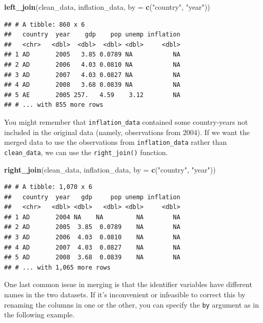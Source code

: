 \documentclass[12pt,oneside,openany]{book}
\newenvironment{Shaded}{\begin{snugshade}}{\end{snugshade}}
\newcommand{\KeywordTok}[1]{\textcolor[rgb]{0.13,0.29,0.53}{\textbf{#1}}}
\newcommand{\DataTypeTok}[1]{\textcolor[rgb]{0.13,0.29,0.53}{#1}}
\newcommand{\StringTok}[1]{\textcolor[rgb]{0.31,0.60,0.02}{#1}}
\newcommand{\NormalTok}[1]{#1}
\begin{document}
\begin{Shaded}
\begin{Highlighting}[]
\KeywordTok{left_join}\NormalTok{(clean_data,}
\NormalTok{          inflation_data,}
          \DataTypeTok{by =} \KeywordTok{c}\NormalTok{(}\StringTok{"country"}\NormalTok{, }\StringTok{"year"}\NormalTok{))}
\end{Highlighting}
\end{Shaded}

\begin{verbatim}
## # A tibble: 860 x 6
##   country  year    gdp    pop unemp inflation
##   <chr>   <dbl>  <dbl>  <dbl> <dbl>     <dbl>
## 1 AD       2005   3.85 0.0789 NA           NA
## 2 AD       2006   4.03 0.0810 NA           NA
## 3 AD       2007   4.03 0.0827 NA           NA
## 4 AD       2008   3.68 0.0839 NA           NA
## 5 AE       2005 257.   4.59    3.12        NA
## # ... with 855 more rows
\end{verbatim}

You might remember that \texttt{inflation\_data} contained some
country-years not included in the original data (namely, observations
from 2004). If we want the merged data to use the observations from
\texttt{inflation\_data} rather than \texttt{clean\_data}, we can use
the \texttt{right\_join()} function.

\begin{Shaded}
\begin{Highlighting}[]
\KeywordTok{right_join}\NormalTok{(clean_data,}
\NormalTok{           inflation_data,}
           \DataTypeTok{by =} \KeywordTok{c}\NormalTok{(}\StringTok{"country"}\NormalTok{, }\StringTok{"year"}\NormalTok{))}
\end{Highlighting}
\end{Shaded}

\begin{verbatim}
## # A tibble: 1,070 x 6
##   country  year   gdp     pop unemp inflation
##   <chr>   <dbl> <dbl>   <dbl> <dbl>     <dbl>
## 1 AD       2004 NA    NA         NA        NA
## 2 AD       2005  3.85  0.0789    NA        NA
## 3 AD       2006  4.03  0.0810    NA        NA
## 4 AD       2007  4.03  0.0827    NA        NA
## 5 AD       2008  3.68  0.0839    NA        NA
## # ... with 1,065 more rows
\end{verbatim}

One last common issue in merging is that the identifier variables have
different names in the two datasets. If it's inconvenient or infeasible
to correct this by renaming the columns in one or the other, you can
specify the \texttt{by} argument as in the following example.
\end{document}
